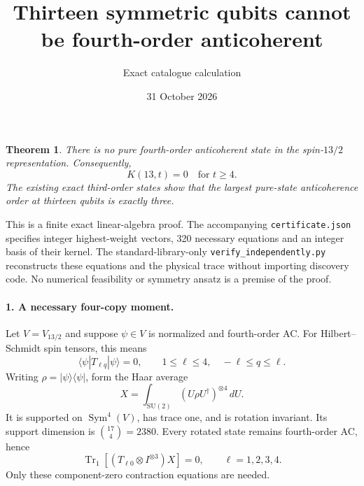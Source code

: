 \documentclass[11pt]{article}
\newtheorem{theorem}{Theorem}
\newcommand{\Tr}{\operatorname{Tr}}
\begin{document}
\title{Thirteen symmetric qubits cannot be fourth-order anticoherent}
\author{Exact catalogue calculation}
\date{31 October 2026}
\maketitle

\begin{theorem}
There is no pure fourth-order anticoherent state in the spin-$13/2$
representation. Consequently,
\[
 \boxed{K(13,t)=0\quad\text{for }t\ge4.}
\]
The existing exact third-order states show that the largest pure-state
anticoherence order at thirteen qubits is exactly three.
\end{theorem}

This is a finite exact linear-algebra proof. The accompanying
\texttt{certificate.json} specifies integer highest-weight vectors,
320 necessary equations and an integer basis of their kernel.
The standard-library-only \texttt{verify\_independently.py} reconstructs
these equations and the physical trace without importing discovery code.
No numerical feasibility or symmetry ansatz is a premise of the proof.

\paragraph{1. A necessary four-copy moment.}
Let $V=V_{13/2}$ and suppose $\psi\in V$ is normalized and fourth-order
AC. For Hilbert--Schmidt spin tensors, this means
\[
 \langle\psi|T_{\ell q}|\psi\rangle=0,
 \qquad1\le\ell\le4,\quad-\ell\le q\le\ell.
\]
Writing $\rho=|\psi\rangle\langle\psi|$, form the Haar average
\[
 X=\int_{\mathrm{SU}(2)}(U\rho U^\dagger)^{\otimes4}\,dU.
\]
It is supported on $\operatorname{Sym}^4(V)$, has trace one, and is
rotation invariant. Its support dimension is $\binom{17}{4}=2380$.
Every rotated state remains fourth-order AC, hence
\begin{equation}\label{contractions}
 \Tr_1[(T_{\ell0}\otimes I^{\otimes3})X]=0,
 \qquad\ell=1,2,3,4.
\end{equation}
Only these component-zero contraction equations are needed.
\end{document}
